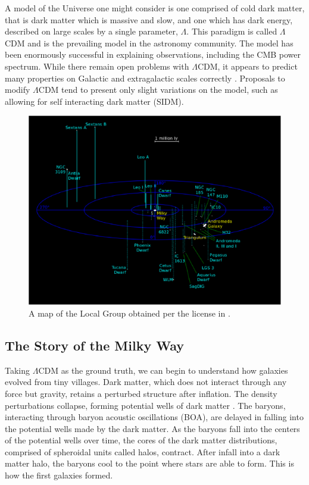 A model of the Universe one might consider is one comprised of cold dark matter, that is dark matter which is massive and slow, and one which has dark energy, described on large scales by a single parameter, $\Lambda$. This paradigm is called $\Lambda$CDM and is the prevailing model in the astronomy community. The model has been enormously successful in explaining observations, including the CMB power spectrum. While there remain open problems with $\Lambda$CDM, it appears to predict many properties on Galactic and extragalactic scales correctly \citep{kolb_turner,dodelson, BT}. Proposals to modify $\Lambda$CDM tend to present only slight variations on the model, such as allowing for self interacting dark matter (SIDM).
\begin{figure}
	\includegraphics[width=\textwidth]{../figures/local_group}
	\caption{A map of the Local Group obtained per the license in \citet{local_group_map}.}\label{fig:local_group}
\end{figure}


\subsection{The Story of the Milky Way}
Taking $\Lambda$CDM as the ground truth, we can begin to understand how galaxies evolved from tiny villages. Dark matter, which does not interact through any force but gravity, retains a perturbed structure after inflation. The density perturbations collapse, forming potential wells of dark matter \citep{taylor_2011}. The baryons, interacting through baryon acoustic oscillations (BOA), are delayed in falling into the potential wells made by the dark matter. As the baryons fall into the centers of the potential wells over time, the cores of the dark matter distributions, comprised of spheroidal units called halos, contract. After infall into a dark matter halo, the baryons cool to the point where stars are able to form. This is how the first galaxies formed.

